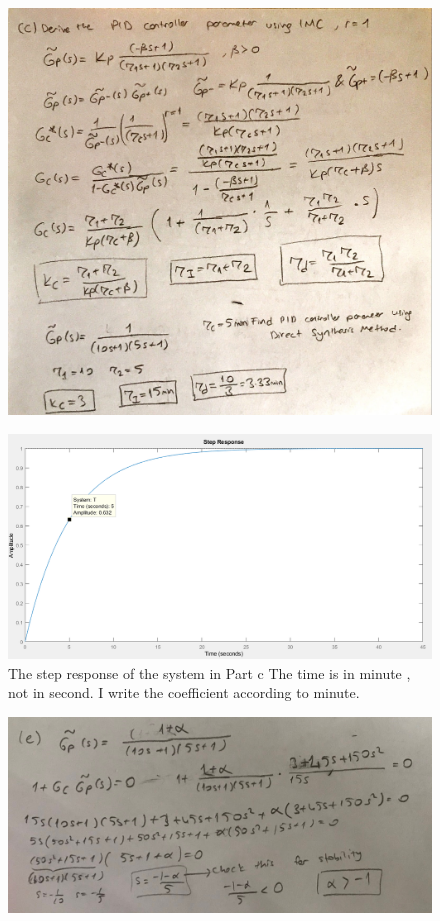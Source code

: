 \documentclass[a4paper,12pt]{article}
\begin{document}
\begin{enumerate}
\begin{figure}[H]
					\includegraphics[width=1.0\unitlength]{images/2c}
				\end{figure}
				\begin{figure}[H]
					\center
					\setlength{\unitlength}{\textwidth} 
					\includegraphics[width=1.0\unitlength]{images/2d}
					\caption{\label{fig:2d}The step response of  the system in Part c
The time is in minute , not in second. I write the coefficient according to minute.}
				\end{figure}
				\begin{figure}[H]
					\center
					\setlength{\unitlength}{\textwidth} 
					\includegraphics[width=1.0\unitlength]{images/2e}

\end{figure}
\end{enumerate}
\end{document}
